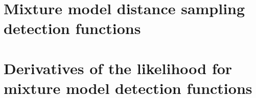 \documentclass[12pt]{report}
\begin{document}
\chapter{Mixture model distance sampling detection functions}



\appendix

%
%
%

\chapter{Derivatives of the likelihood for mixture model detection functions}






\end{document}
